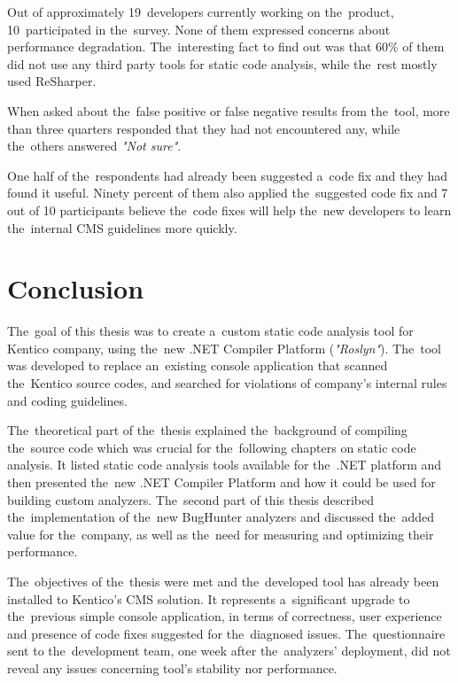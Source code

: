 \documentclass[
  digital, %
  table,   %
  lof,     %
  lot,     %
  oneside,
]{fithesis3}
\begin{document}
Out of approximately 19~developers currently working on the~product, 10~participated in the~survey. None of them expressed concerns about performance degradation. The~interesting fact to find out was that 60\% of them did not use any third party tools for static code analysis, while the~rest mostly used ReSharper.

When asked about the~false positive or false negative results from the~tool, more than three quarters responded that they had not encountered any, while the~others answered \textit{"Not sure"}.

One half of the~respondents had already been suggested a~code fix and they had found it useful. Ninety percent of them also applied the~suggested code fix and 7 out of 10 participants believe the~code fixes will help the~new developers to learn the~internal CMS guidelines more quickly.


\chapter{Conclusion}
The~goal of this thesis was to create a~custom static code analysis tool for Kentico company, using the~new .NET Compiler Platform (\textit{"Roslyn"}). The~tool was developed to replace an~existing console application that scanned the~Kentico source codes, and searched for violations of company's internal rules and coding guidelines.

The~theoretical part of the~thesis explained the~background of compiling the~source code which was crucial for the~following chapters on static code analysis. It listed static code analysis tools available for the~.NET platform and then presented the~new .NET Compiler Platform and how it could be used for building custom analyzers. The~second part of this thesis described the~implementation of the~new BugHunter analyzers and discussed the~added value for the~company, as well as the~need for measuring and optimizing their performance.

The~objectives of the~thesis were met and the~developed tool has already been installed to Kentico's CMS solution. It represents a~significant upgrade to the~previous simple console application, in terms of correctness, user experience and presence of code fixes suggested for the~diagnosed issues. The~questionnaire sent to the~development team, one week after the~analyzers' deployment, did not reveal any issues concerning tool's stability nor performance.
\end{document}

